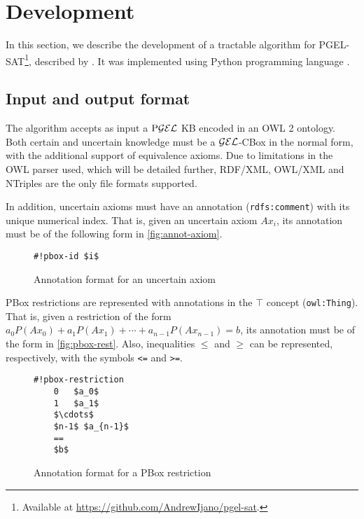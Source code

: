 
\chapter{Development}
\label{cap:development}

In this section, we describe the development of a tractable algorithm for PGEL-SAT\footnote{Available at \url{https://github.com/AndrewIjano/pgel-sat}.}, described by \citet{Fin2020}. It was implemented using Python programming language \citep{python3}. 

\section{Input and output format}

The algorithm accepts as input a $\text{P}\mathcal{GEL}$ KB encoded in an OWL 2 ontology. Both certain and uncertain knowledge must be a $\mathcal{GEL}$-CBox in the normal form, with the additional support of equivalence axioms. Due to limitations in the OWL parser used, which will be detailed further, RDF/XML, OWL/XML and NTriples are the only file formats supported.

In addition, uncertain axioms must have an annotation (\texttt{rdfs:comment}) with its unique numerical index. That is, given an uncertain axiom $Ax_i$, its annotation must be of the following form in \autoref{fig:annot-axiom}.
\begin{figure}
	\centering
	\begin{minipage}{6cm}
		\begin{lstlisting}[style=mystyle]
      #!pbox-id $i$
    \end{lstlisting}
	\end{minipage}
	\caption{Annotation format for an uncertain axiom}
	\label{fig:annot-axiom}
\end{figure}

PBox restrictions are represented with annotations in the $\top$ concept (\texttt{owl:Thing}). That is, given a restriction of the form $a_0 P(Ax_0) + a_1P(Ax_1) + \cdots + a_{n-1} P(Ax_{n-1}) = b$, its annotation must be of the form in \autoref{fig:pbox-rest}.  Also, inequalities $\leq$ and $\geq$ can be represented, respectively, with the symbols \texttt{<=} and \texttt{>=}.

\begin{figure}
	\centering
	\begin{minipage}{6cm}
		\begin{lstlisting}[style=mystyle]
    #!pbox-restriction
    0   $a_0$
    1   $a_1$
    $\cdots$
    $n-1$ $a_{n-1}$
    ==
    $b$
    \end{lstlisting}
	\end{minipage}
	\caption{Annotation format for a PBox restriction}
	\label{fig:pbox-rest}
\end{figure}


